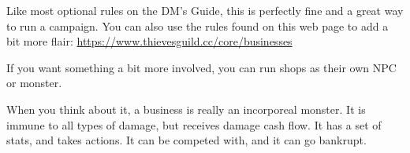 \documentclass[twocolumn]{dndbook}
\begin{document}
Like most optional rules on the DM's Guide, this is perfectly fine and a great way to run a campaign.
You can also use the rules found on this web page to add a bit more flair:
\url{https://www.thievesguild.cc/core/businesses}\par

If you want something a bit more involved, you can run shops as their own NPC or monster.\par

\begin{emphasisParagraph}
	When you think about it, a business is really an incorporeal monster.
	It is immune to all types of damage, but receives damage
	cash flow. It has a set of stats, and takes actions.
	It can be competed with, and it can go bankrupt.
\end{emphasisParagraph}
\end{document}
